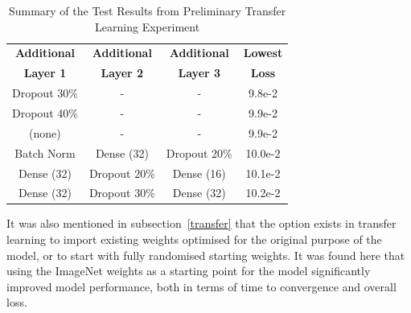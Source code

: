 \begin{table}[h!]
	\begin{center}
		
		\begin{tabular}{c|c|c|c} %
			\textbf{Additional} & \textbf{Additional} & \textbf{Additional} & \textbf{Lowest} \\
			
			\textbf{Layer 1} & \textbf{Layer 2} & \textbf{Layer 3} & \textbf{Loss} \\
			\hline
			Dropout 30\% & - & - & 9.8e-2  \\
			Dropout 40\% & - & - & 9.9e-2  \\ 
			(none) & - & - & 9.9e-2  \\
			Batch Norm & Dense (32) & Dropout 20\% & 10.0e-2  \\
			Dense (32) & Dropout 20\% & Dense (16) & 10.1e-2  \\
			Dense (32) & Dropout 30\% & Dense (32) & 10.2e-2  \\
		\end{tabular}
		\caption{Summary of the Test Results from Preliminary Transfer Learning Experiment}
		\label{tab:exp3}
	\end{center}
\end{table}

\noindent
It was also mentioned in subsection~\ref{transfer} that the option exists in transfer learning to import existing weights optimised for the original purpose of the model, or to start with fully randomised starting weights. It was found here that using the ImageNet weights as a starting point for the model significantly improved model performance, both in terms of time to convergence and overall loss.

